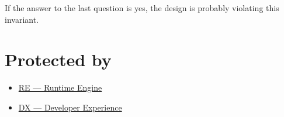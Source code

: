 If the answer to the last question is yes, the design is probably violating this invariant.

\section{Protected by}\label{record-036-protected-by}

\begin{itemize}
\tightlist
\item
  \href{https://github.com/flyingrobots/bijou/blob/1853ad902f6bf219326409e7f743a5a1d6517dbc/docs/legends/RE-runtime-engine.md}{RE --- Runtime Engine}
\item
  \href{https://github.com/flyingrobots/bijou/blob/1853ad902f6bf219326409e7f743a5a1d6517dbc/docs/legends/DX-developer-experience.md}{DX --- Developer Experience}
\end{itemize}

